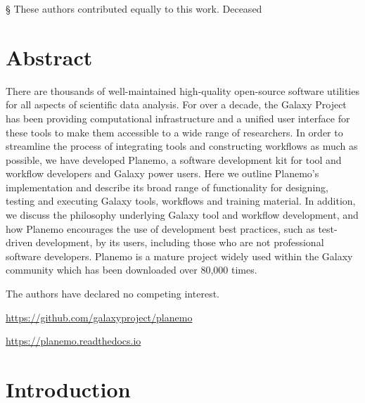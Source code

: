 § These authors contributed equally to this work.
\dag Deceased

\section*{Abstract}
There are thousands of well-maintained high-quality open-source software
utilities for all aspects of scientific data analysis. For over a
decade, the Galaxy Project has been providing computational
infrastructure and a unified user interface for these tools to make them
accessible to a wide range of researchers. In order to streamline the
process of integrating tools and constructing workflows as much as
possible, we have developed Planemo, a software development kit for tool
and workflow developers and Galaxy power users. Here we outline
Planemo's implementation and describe its broad range of functionality
for designing, testing and executing Galaxy tools, workflows and
training material. In addition, we discuss the philosophy underlying
Galaxy tool and workflow development, and how Planemo encourages the use
of development best practices, such as test-driven development, by its
users, including those who are not professional software developers.
Planemo is a mature project widely used within the Galaxy community
which has been downloaded over 80,000 times.

The authors have declared no competing interest.

\url{https://github.com/galaxyproject/planemo}

\url{https://planemo.readthedocs.io}


\section*{Introduction}

